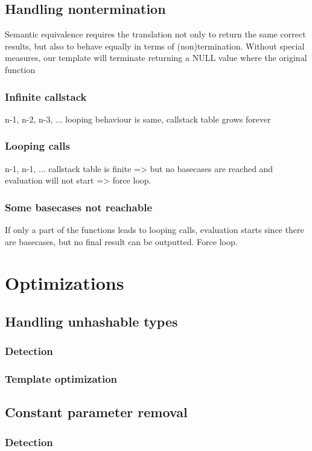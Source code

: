 \section{Handling nontermination}
Semantic equivalence requires the translation not only to return the same correct results, but also to behave equally in terms of (non)termination. Without special measures, our template will terminate returning a NULL value where the original function 
\subsection{Infinite callstack}
n-1, n-2, n-3, ... looping behaviour is same, callstack table grows forever

\subsection{Looping calls}
n-1, n-1, ... callstack table is finite => but no basecases are reached and evaluation will not start => force loop.

\subsection{Some basecases not reachable}
If only a part of the functions leads to looping calls, evaluation starts since there are basecases, but no final result can be outputted. Force loop.

\chapter{Optimizations}
\section{Handling unhashable types}
\subsection{Detection}
\subsection{Template optimization}

\section{Constant parameter removal}
\subsection{Detection}
